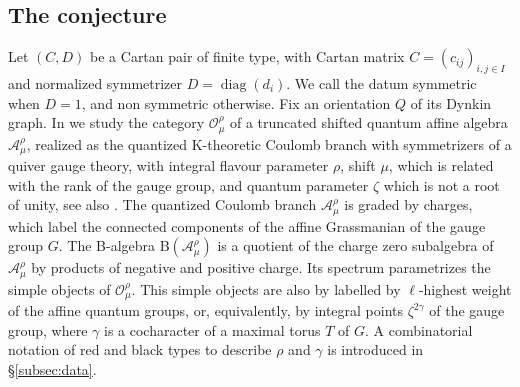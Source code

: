\documentclass[11pt,reqno]{amsart}
\theoremstyle{definition}
\theoremstyle{remark}
\def\scrO{\mathscr O}
\def\B{\mathrm B}
\def\calA{\mathcal A}
\begin{document}
\subsection{The conjecture}
Let $(C,D)$ be a Cartan pair of finite type, with Cartan matrix
$C=(c_{ij})_{i,j\in I}$ and normalized symmetrizer
$D=\operatorname{diag}(d_i)$. We call the datum symmetric when
$D=1$, and non symmetric otherwise. Fix an orientation $Q$ of its
Dynkin graph. In \cite{VVsh} we study the category
$\scrO_\mu^\rho$ of a truncated shifted quantum affine algebra
$\calA_\mu^\rho$, realized as the quantized K-theoretic Coulomb branch with
symmetrizers of a quiver gauge theory, with integral flavour parameter $\rho$,
shift $\mu$, which is related with the rank of the gauge group,
and quantum parameter $\zeta$ which is not a root of unity, see also \cite{NW23}. 
The quantized Coulomb branch $\calA_\mu^\rho$ is graded by charges, 
which label the connected components of the affine Grassmanian of the gauge group $G$.
The B-algebra
$\B(\calA_\mu^\rho)$ is a quotient of the charge zero subalgebra of $\calA_\mu^\rho$ by
products of negative and positive charge. Its spectrum parametrizes
the simple objects of $\scrO_\mu^\rho$. 
This simple objects are also by labelled by $\ell$-highest weight of the affine quantum groups, or, equivalently, by integral points 
$\zeta^{2\gamma}$ of the gauge group,
where $\gamma$ is a cocharacter of a maximal torus $T$ of  $G$.
A combinatorial notation of red and black types to describe $\rho$
and $\gamma$ is introduced in
\S\ref{subsec:data}.
\end{document}
